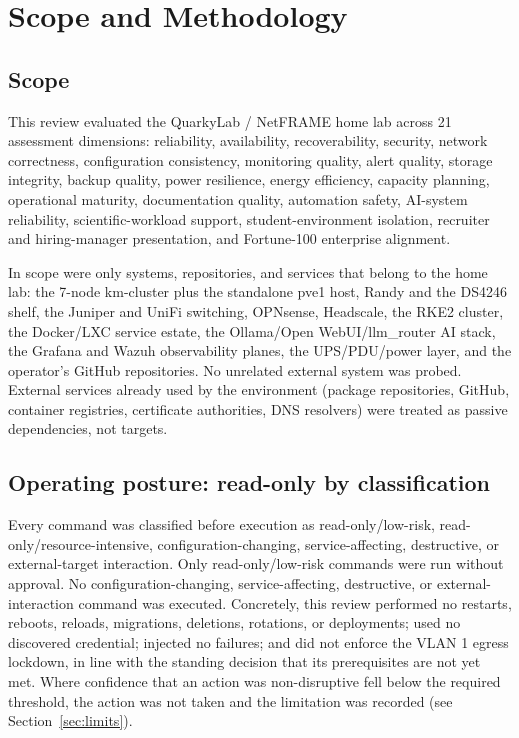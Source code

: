 \section{Scope and Methodology}\label{sec:scope}

\subsection{Scope}

This review evaluated the QuarkyLab / NetFRAME home lab across 21 assessment
dimensions: reliability, availability, recoverability, security, network
correctness, configuration consistency, monitoring quality, alert quality, storage
integrity, backup quality, power resilience, energy efficiency, capacity planning,
operational maturity, documentation quality, automation safety, AI-system
reliability, scientific-workload support, student-environment isolation, recruiter
and hiring-manager presentation, and Fortune-100 enterprise alignment.

In scope were only systems, repositories, and services that belong to the home lab:
the 7-node km-cluster plus the standalone pve1 host, Randy and the DS4246 shelf, the
Juniper and UniFi switching, OPNsense, Headscale, the RKE2 cluster, the Docker/LXC
service estate, the Ollama/Open WebUI/llm\_router AI stack, the Grafana and Wazuh
observability planes, the UPS/PDU/power layer, and the operator's GitHub
repositories. No unrelated external system was probed. External services already
used by the environment (package repositories, GitHub, container registries,
certificate authorities, DNS resolvers) were treated as passive dependencies, not
targets.

\subsection{Operating posture: read-only by classification}

Every command was classified before execution as read-only/low-risk,
read-only/resource-intensive, configuration-changing, service-affecting,
destructive, or external-target interaction. Only read-only/low-risk commands were
run without approval. No configuration-changing, service-affecting, destructive, or
external-interaction command was executed. Concretely, this review performed no
restarts, reboots, reloads, migrations, deletions, rotations, or deployments; used
no discovered credential; injected no failures; and did not enforce the VLAN 1
egress lockdown, in line with the standing decision that its prerequisites are not
yet met. Where confidence that an action was non-disruptive fell below the required
threshold, the action was not taken and the limitation was recorded (see
Section~\ref{sec:limits}).

